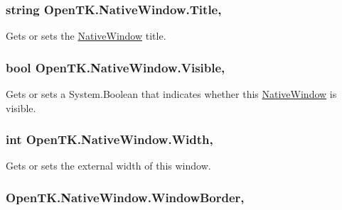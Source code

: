 \hypertarget{class_open_t_k_1_1_native_window_af5cd587c921ef6c10709fc69a1e2900b}{
\subsubsection[{Title}]{\setlength{\rightskip}{0pt plus 5cm}string Open\-T\-K.\-Native\-Window.\-Title\hspace{0.3cm}{\ttfamily [get]}, {\ttfamily [set]}}}\label{class_open_t_k_1_1_native_window_af5cd587c921ef6c10709fc69a1e2900b}


Gets or sets the \hyperlink{class_open_t_k_1_1_native_window}{Native\-Window} title. 

\hypertarget{class_open_t_k_1_1_native_window_aff1fe36bb34bb3ba53814a7aaceea940}{
\subsubsection[{Visible}]{\setlength{\rightskip}{0pt plus 5cm}bool Open\-T\-K.\-Native\-Window.\-Visible\hspace{0.3cm}{\ttfamily [get]}, {\ttfamily [set]}}}\label{class_open_t_k_1_1_native_window_aff1fe36bb34bb3ba53814a7aaceea940}


Gets or sets a System.\-Boolean that indicates whether this \hyperlink{class_open_t_k_1_1_native_window}{Native\-Window} is visible. 

\hypertarget{class_open_t_k_1_1_native_window_a0cea0939dfd9dc512757e80cfa588de6}{
\subsubsection[{Width}]{\setlength{\rightskip}{0pt plus 5cm}int Open\-T\-K.\-Native\-Window.\-Width\hspace{0.3cm}{\ttfamily [get]}, {\ttfamily [set]}}}\label{class_open_t_k_1_1_native_window_a0cea0939dfd9dc512757e80cfa588de6}


Gets or sets the external width of this window. 

\hypertarget{class_open_t_k_1_1_native_window_a847af2dd07cb323f3a96767bb96ea44b}{
\subsubsection[{Window\-Border}]{ Open\-T\-K.\-Native\-Window.\-Window\-Border\hspace{0.3cm}{\ttfamily [get]}, {\ttfamily [set]}}}\label{class_open_t_k_1_1_native_window_a847af2dd07cb323f3a96767bb96ea44b}


